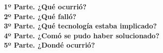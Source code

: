 \documentclass{article}
\title{}
\author{
Guillermo López García
\and
Adrián Dávila Guerra
}
\begin{document}
\maketitle

\textbf{1º Parte. ¿Qué ocurrió?}\\

\textbf{2º Parte. ¿Qué falló?}\\

\textbf{3º Parte. ¿Qué tecnología estaba implicado?}\\

\textbf{4º Parte. ¿Comó se pudo haber solucionado?}\\

\textbf{5º Parte. ¿Dondé ocurrió?}\\

%
\end{document}
